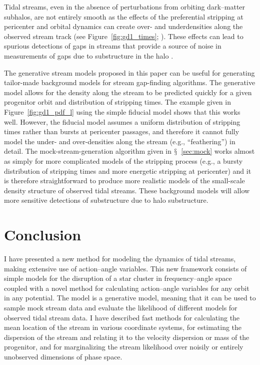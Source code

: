 \documentclass[12pt,preprint]{aastex}
\newcommand{\eg}{e.g.}
\renewcommand{\figurename}{Figure}
\newcommand{\sectionname}{$\mathsection$}
\begin{document}
Tidal streams, even in the absence of perturbations from orbiting
dark--matter subhalos, are not entirely smooth as the effects of the
preferential stripping at pericenter and orbital dynamics can create
over- and underdensities along the observed stream track (see
\figurename~\ref{fig:gd1_times}; \citealt{Kuepper10a}). These effects
can lead to spurious detections of gaps in streams that provide a
source of noise in measurements of gaps due to substructure in the
halo \citep{Ngan14a}. 

The generative stream models proposed in this paper can be useful for
generating tailor-made background models for stream gap-finding
algorithms. The generative model allows for the density along the
stream to be predicted quickly for a given progenitor orbit and
distribution of stripping times. The example given in
\figurename~\ref{fig:gd1_pdf_l} using the simple fiducial model shows
that this works well. However, the fiducial model assumes a uniform
distribution of stripping times rather than bursts at pericenter
passages, and therefore it cannot fully model the under- and
over-densities along the stream (\eg, ``feathering'') in detail. The
mock-stream-generation algorithm given in \sectionname~\ref{sec:mock}
works almost as simply for more complicated models of the stripping
process (\eg, a bursty distribution of stripping times and more
energetic stripping at pericenter) and it is therefore straightforward
to produce more realistic models of the small-scale density structure
of observed tidal streams. These background models will allow more
sensitive detections of substructure due to halo substructure.

\section{Conclusion}\label{sec:conclusion}

I have presented a new method for modeling the dynamics of tidal
streams, making extensive use of action--angle variables. This new
framework consists of simple models for the disruption of a star
cluster in frequency--angle space coupled with a novel method for
calculating action--angle variables for any orbit in any
potential. The model is a generative model, meaning that it can be
used to sample mock stream data and evaluate the likelihood of
different models for observed tidal stream data. I have described fast
methods for calculating the mean location of the stream in various
coordinate systems, for estimating the dispersion of the stream and
relating it to the velocity dispersion or mass of the progenitor, and
for marginalizing the stream likelihood over noisily or entirely
unobserved dimensions of phase space.
\end{document}
